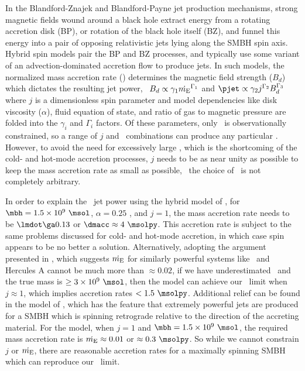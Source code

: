 \documentclass[11pt, preprint]{aastex}
\begin{document}
In the Blandford-Znajek \citep[BZ;][]{bz} and Blandford-Payne
\citep[BP;][]{bp} jet production mechanisms, strong magnetic fields
wound around a black hole extract energy from a rotating accretion
disk (BP), or rotation of the black hole itself (BZ), and funnel this
energy into a pair of opposing relativistic jets lying along the SMBH
spin axis. Hybrid spin models \citep[\eg][]{1999ApJ...522..753M,
  2001ApJ...548L...9M, 2006ApJ...651.1023R, 2007MNRAS.377.1652N,
  2009MNRAS.397.1302B, gesspin} pair the BP and BZ processes, and
typically use some variant of an advection-dominated accretion flow
\citep[ADAF;][]{adaf} to produce jets. In such models, the normalized
mass accretion rate (\dme) determines the magnetic field strength
($B_d$) which dictates the resulting jet power, \ie\ $B_d \propto
\gamma_1 \dot{m_{\rm{E}}}^{\Gamma_1}$ and $\pjet \propto \gamma_2 j^{\Gamma_2}
B_d^{\Gamma_3}$ where $j$ is a dimensionless spin parameter and model
dependencies like disk viscosity ($\alpha$), fluid equation of state,
and ratio of gas to magnetic pressure are folded into the $\gamma_i$
and $\Gamma_i$ factors. Of these parameters, only \pjet\ is
observationally constrained, so a range of $j$ and \dme\ combinations
can produce any particular \pjet. However, to avoid the need for
excessively large \dme, which is the shortcoming of the cold- and
hot-mode accretion processes, $j$ needs to be as near unity as
possible to keep the mass accretion rate as small as possible,
\ie\ the choice of \dme\ is not completely arbitrary.

In order to explain the \rbs\ jet power using the hybrid model of
\citet{2007MNRAS.377.1652N}, for $\mbh = 1.5 \times 10^9 ~\msol$,
$\alpha = 0.25$ \citep{1999ApJ...520..298Q}, and $j = 1$, the mass
accretion rate needs to be $\lmdot \ga 0.13$ or $\dmacc \approx 4
~\msolpy$. This accretion rate is subject to the same problems
discussed for cold- and hot-mode accretion, in which case spin appears
to be no better a solution. Alternatively, adopting the argument
presented in \citet{minaspin}, which suggests $\dot{m_{\rm{E}}}$ for similarly
powerful systems like \ms\ and Hercules A cannot be much more than
$\approx 0.02$, if we have underestimated \mbh\ and the true mass is
$\ge 3 \times 10^9 ~\msol$, then the \citet{2007MNRAS.377.1652N} model
can achieve our \pjet\ limit when $j \approx 1$, which implies
accretion rates $< 1.5 ~\msolpy$. Additional relief can be found in
the model of \citet{gesspin}, which has the feature that extremely
powerful jets are produced for a SMBH which is spinning retrograde
relative to the direction of the accreting material. For the
\citet{gesspin} model, when $j=1$ and $\mbh = 1.5 \times 10^9 ~\msol$,
the required mass accretion rate is $\dot{m_{\rm{E}}} \approx 0.01$ or $\approx
0.3 ~\msolpy$. So while we cannot constrain $j$ or $\dot{m_{\rm{E}}}$, there are
reasonable accretion rates for a maximally spinning SMBH which can
reproduce our \pjet\ limit.
\end{document}
